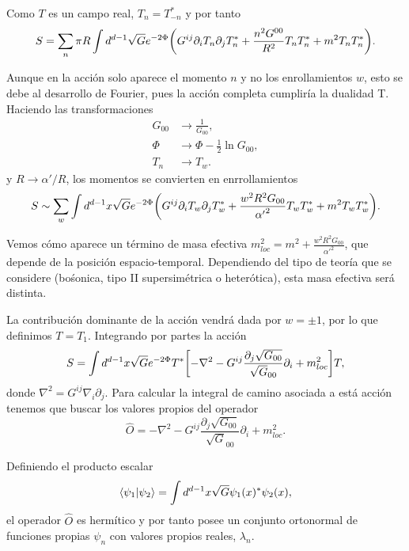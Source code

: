 Como $T$ es un campo real, $T_n=T^*_{-n}$ y por tanto
\begin{equation}
  S=\sum_n \pi R \int d^{d-1} \sqrt{G}e^{-2\Phi}\qty(G^{ij}\partial_i T_n \partial_j T_{n}^* + \frac{n^2 G^{00}}{R^2}T_n T_{n}^* + m^2 T_n T_{n}^*).
\end{equation}

Aunque en la acción solo aparece el momento $n$ y no los enrollamientos $w$, esto se debe 
al desarrollo de Fourier, pues la acción completa cumpliría la dualidad T. 
Haciendo las transformaciones 
\begin{equation}
  \begin{aligned}
    G_{00}&\to \frac{1}{G_{00}},\\
    \Phi&\to \Phi -\frac{1}{2}\ln G_{00},\\
    T_n&\to T_w.
  \end{aligned}
\end{equation}
y $R\to \alpha'/R$, los momentos se convierten en 
enrrollamientos
\begin{equation}
  S \sim\sum_w  \int d^{d-1} x \sqrt G e^{-2\Phi}\qty(G^{ij}\partial_i T_w \partial_j T_{w}^* + \frac{w^2 R^2 G_{00}}{{\alpha'}^2}T_w T_{w}^* + m^2 T_w T_{w}^*) .
\end{equation}

Vemos cómo aparece un término de masa efectiva $m^2_{loc} = m^2 +\frac{w^2 R^2 G_{00}}{{\alpha'}^2}$,
que depende de la posición espacio-temporal.
Dependiendo del tipo de teoría que se considere (bośonica, tipo II supersimétrica o heterótica), 
esta masa efectiva será distinta.

La contribución dominante de la acción vendrá dada por $w=\pm 1$, por lo que definimos $T=T_1$.
Integrando por partes la acción 
\begin{equation}
  S = \int d^{d-1} x \sqrt G e^{-2\Phi} T^* \qty[-\nabla^2-G^{ij}\frac{\partial_j \sqrt{G_{00}}}{\sqrt G_{00}}\partial_i + m^2_{loc}]T,
\end{equation}
donde $\nabla^2 = G^{ij}\nabla_i \partial_j$.
Para calcular la integral de camino asociada a está acción tenemos que buscar los valores
propios del operador 
\begin{equation}
  \widehat{O} =-\nabla^2-G^{ij}\frac{\partial_j \sqrt{G_{00}}}{\sqrt G_{00}}\partial_i + m^2_{loc}.
\end{equation}

Definiendo el producto escalar
\begin{equation}
  \braket{\psi_1}{\psi_2} = \int d^{d-1} x \sqrt G \psi_1(x)^* \psi_2(x),
\end{equation}
el operador $\widehat O$ es hermítico y por tanto posee un conjunto ortonormal de funciones
propias $\psi_n$ con valores propios reales, $\lambda_n$.

